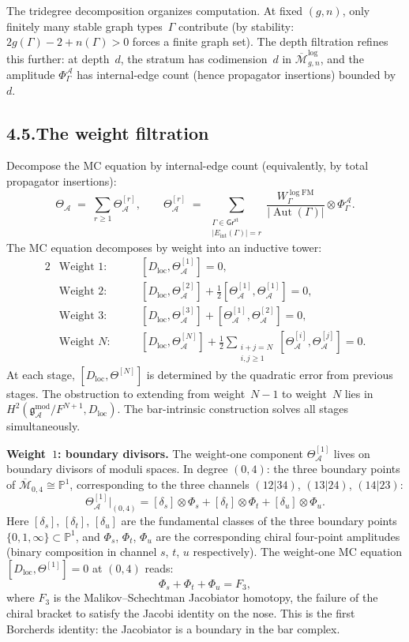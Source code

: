 \documentclass[11pt]{report}
\theoremstyle{definition}
\theoremstyle{remark}
\providecommand{\cA}{\mathcal{A}}
\providecommand{\cM}{\mathcal{M}}
\providecommand{\gAmod}{\mathfrak{g}^{\mathrm{mod}}_\cA}
\numberwithin{equation}{section}
\begin{document}
The tridegree decomposition organizes computation. At fixed
$(g,n)$, only finitely many stable graph types~$\Gamma$ contribute
(by stability: $2g(\Gamma)-2+n(\Gamma)>0$ forces a finite graph
set). The depth filtration refines this further: at depth~$d$,
the stratum has codimension~$d$ in $\overline{\cM}_{g,n}^{\log}$,
and the amplitude $\Phi^\cA_\Gamma$ has internal-edge count
(hence propagator insertions) bounded by~$d$.

\subsection*{4.5.\enspace The weight filtration}

Decompose the MC equation by internal-edge count (equivalently, by total
propagator insertions):
\[
\Theta_\cA\;=\;\sum_{r\ge 1}\Theta^{[r]}_\cA,
\qquad
\Theta^{[r]}_\cA\;=\;
\sum_{\substack{\Gamma\in\mathsf{Gr}^{\mathrm{st}}\\
|E_{\mathrm{int}}(\Gamma)|=r}}
\frac{W^{\log\mathrm{FM}}_\Gamma}{|\operatorname{Aut}(\Gamma)|}
\otimes\Phi^\cA_\Gamma.
\]
The MC equation decomposes by weight into an inductive tower:
\begin{alignat*}{2}
&\text{Weight }1{:}\quad
&&[D_{\mathrm{loc}},\Theta^{[1]}_\cA]=0,\\[4pt]
&\text{Weight }2{:}\quad
&&[D_{\mathrm{loc}},\Theta^{[2]}_\cA]
+\tfrac12[\Theta^{[1]}_\cA,\Theta^{[1]}_\cA]=0,\\[4pt]
&\text{Weight }3{:}\quad
&&[D_{\mathrm{loc}},\Theta^{[3]}_\cA]
+[\Theta^{[1]}_\cA,\Theta^{[2]}_\cA]=0,\\[4pt]
&\text{Weight }N{:}\quad
&&[D_{\mathrm{loc}},\Theta^{[N]}_\cA]
+\tfrac12\sum_{\substack{i+j=N\\i,j\ge 1}}
[\Theta^{[i]}_\cA,\Theta^{[j]}_\cA]=0.
\end{alignat*}
At each stage, $[D_{\mathrm{loc}},\Theta^{[N]}]$ is determined by
the quadratic error from previous stages. The obstruction to
extending from weight~$N-1$ to weight~$N$ lies in
$H^2(\gAmod/F^{N+1},D_{\mathrm{loc}})$. The bar-intrinsic
construction solves all stages simultaneously.

\medskip

\noindent\textbf{Weight~$1$: boundary divisors.}\enspace
The weight-one component $\Theta^{[1]}_\cA$ lives on boundary
divisors of moduli spaces. In degree $(0,4)$: the three boundary
points of $\overline{\cM}_{0,4}\cong\mathbb P^1$, corresponding to
the three channels $(12|34)$, $(13|24)$, $(14|23)$:
\[
\Theta^{[1]}_\cA\big|_{(0,4)}
=[\delta_s]\otimes\Phi_s
+[\delta_t]\otimes\Phi_t
+[\delta_u]\otimes\Phi_u.
\]
Here $[\delta_s]$, $[\delta_t]$, $[\delta_u]$ are the fundamental
classes of the three boundary points $\{0,1,\infty\}\subset\mathbb
P^1$, and $\Phi_s$, $\Phi_t$, $\Phi_u$ are the corresponding chiral
four-point amplitudes (binary composition in channel $s$, $t$, $u$
respectively). The weight-one MC equation
$[D_{\mathrm{loc}},\Theta^{[1]}]=0$ at $(0,4)$ reads:
\[
\Phi_s+\Phi_t+\Phi_u=F_3,
\]
where $F_3$ is the Malikov--Schechtman Jacobiator homotopy, the
failure of the chiral bracket to satisfy the Jacobi identity on the
nose. This is the first Borcherds identity: the Jacobiator is a
boundary in the bar complex.
\end{document}
